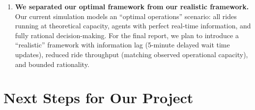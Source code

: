 \documentclass[11pt]{article}
\begin{document}
\begin{enumerate}
    \item \textbf{We separated our optimal framework from our realistic framework.} Our current simulation models an ``optimal operations'' scenario: all rides running at theoretical capacity, agents with perfect real-time information, and fully rational decision-making. For the final report, we plan to introduce a ``realistic'' framework with information lag (5-minute delayed wait time updates), reduced ride throughput (matching observed operational capacity), and bounded rationality.
\end{enumerate}

\section{Next Steps for Our Project}
\end{document}

